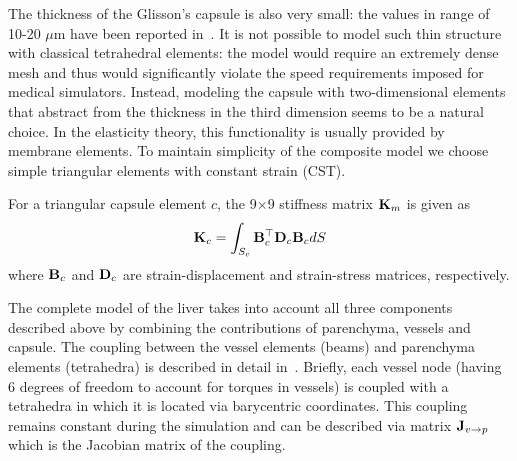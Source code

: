 
The thickness of the Glisson's capsule is also very small: the values in range of 10-20 $\mu$m have been reported in~\cite{Umale2011}.
It is not possible to model such thin structure with classical tetrahedral elements:
the model would require an extremely 
dense mesh and thus would significantly violate the speed requirements imposed for medical simulators.
Instead, modeling the capsule with two-dimensional elements that abstract from the
thickness in the third dimension seems
to be a natural choice. In the elasticity theory, this functionality is usually provided by membrane elements.
To maintain simplicity of the composite model we choose simple triangular elements with constant strain (CST).

For a triangular capsule element $c$, the 9$\times$9 stiffness matrix $\mathbf{K}_m$ is given as 
\begin{equation}
 \mathbf{K}_c = \int_{S_c} \mathbf{B}_c^\top \mathbf{D}_c \mathbf{B}_c dS 
\end{equation}
where $\mathbf{B}_c$ and $\mathbf{D}_c$ are strain-displacement and strain-stress matrices, respectively. 

The complete model of the liver takes into account all three components described above by combining the contributions 
of parenchyma, vessels and capsule. The coupling between the vessel elements (beams) and parenchyma elements (tetrahedra)
is described in detail in~\cite{Peterlik2012}. Briefly, each vessel node (having 6 degrees of freedom to account for torques in vessels) 
is coupled with a tetrahedra in which it is located via barycentric coordinates. This coupling remains constant during 
the simulation and can be described via matrix $\mathbf{J}_{v\rightarrow p}$ which is the Jacobian matrix of the coupling.

